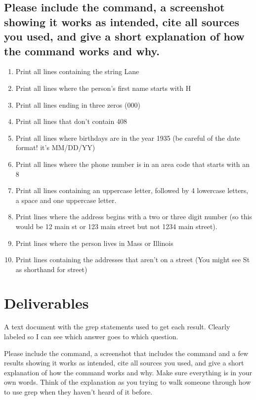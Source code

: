 \documentclass[12pt]{article}
\begin{document}
\subsection*{Please include the command, a screenshot showing it works as intended, cite all sources you used, and give a short explanation of how the command works and why.}
    \begin{enumerate}
        \item Print all lines containing the string Lane
        \item Print all lines where the person's first name starts with H
        \item Print all lines ending in three zeros (000)
        \item Print all lines that don't contain 408
        \item Print all lines where birthdays are in the year 1935 (be careful of the date format! it's MM/DD/YY)
        \item Print all lines where the phone number is in an area code that starts with an 8
        \item Print all lines containing an uppercase letter, followed by 4 lowercase letters, a space and one uppercase letter.
        \item Print lines where the address begins with a two or three digit number (so this would be 12 main st or 123 main street but not 1234 main street).
        \item Print lines where the person lives in Mass or Illinois
        \item Print lines containing the addresses that aren't on a street (You might see St as shorthand for street)


    \end{enumerate}



\section*{Deliverables}
A text document with the grep statements used to get each result.  Clearly labeled so I can see which answer goes to which question.


Please include the command, a screenshot that includes the command and a few results showing it works as intended, cite all sources you used, and give a short explanation of how the command works and why. Make sure everything is in your own words.  Think of the explanation as you trying to walk someone through how to use grep when they haven't heard of it before.
\end{document}
